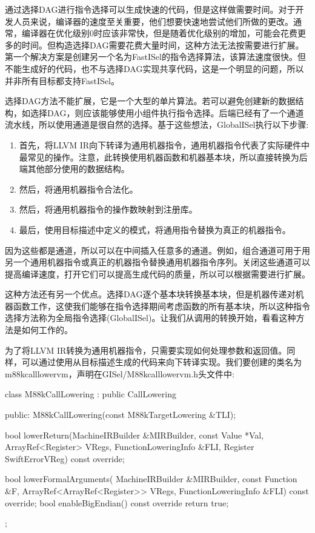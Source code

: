 
通过选择DAG进行指令选择可以生成快速的代码，但是这样做需要时间。对于开发人员来说，编译器的速度至关重要，他们想要快速地尝试他们所做的更改。通常，编译器在优化级别0时应该非常快，但是随着优化级别的增加，可能会花费更多的时间。但构造选择DAG需要花费大量时间，这种方法无法按需要进行扩展。第一个解决方案是创建另一个名为FastISel的指令选择算法，该算法速度很快。但不能生成好的代码，也不与选择DAG实现共享代码，这是一个明显的问题，所以并非所有目标都支持FastISel。

选择DAG方法不能扩展，它是一个大型的单片算法。若可以避免创建新的数据结构，如选择DAG，则应该能够使用小组件执行指令选择。后端已经有了一个通道流水线，所以使用通道是很自然的选择。基于这些想法，GlobalISel执行以下步骤:

\begin{enumerate}
\item
首先，将LLVM IR向下转译为通用机器指令，通用机器指令代表了实际硬件中最常见的操作。注意，此转换使用机器函数和机器基本块，所以直接转换为后端其他部分使用的数据结构。

\item
然后，将通用机器指令合法化。

\item
然后，将通用机器指令的操作数映射到注册库。

\item
最后，使用目标描述中定义的模式，将通用指令替换为真正的机器指令。
\end{enumerate}

因为这些都是通道，所以可以在中间插入任意多的通道。例如，组合通道可用于用另一个通用机器指令或真正的机器指令替换通用机器指令序列。关闭这些通道可以提高编译速度，打开它们可以提高生成代码的质量，所以可以根据需要进行扩展。

这种方法还有另一个优点。选择DAG逐个基本块转换基本块，但是机器传递对机器函数工作，这使我们能够在指令选择期间考虑函数的所有基本块，所以这种指令选择方法称为全局指令选择(GlobalISel)。让我们从调用的转换开始，看看这种方法是如何工作的。



为了将LLVM IR转换为通用机器指令，只需要实现如何处理参数和返回值。同样，可以通过使用从目标描述生成的代码来向下转译实现。我们要创建的类名为m88kcalllowervm，声明在GISel/M88kcalllowervm.h头文件中:

\begin{cpp}
class M88kCallLowering : public CallLowering {
public:
    M88kCallLowering(const M88kTargetLowering &TLI);

    bool
    lowerReturn(MachineIRBuilder &MIRBuilder,
                const Value *Val,
                ArrayRef<Register> VRegs,
                FunctionLoweringInfo &FLI,
                Register SwiftErrorVReg) const override;

    bool lowerFormalArguments(
        MachineIRBuilder &MIRBuilder, const Function &F,
        ArrayRef<ArrayRef<Register>> VRegs,
        FunctionLoweringInfo &FLI) const override;
    bool enableBigEndian() const override { return true; }
};
\end{cpp}

